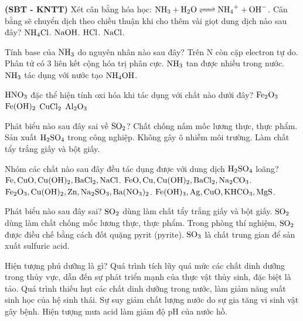 \documentclass[12pt,a4paper]{article}
\begin{document}
\begin{ex}
\textbf{(SBT - KNTT)} Xét cân bằng hóa học: $\ce{NH3 + H2O <=> NH4+ + OH-}$. Cân bằng sẽ chuyển dịch theo chiều thuận khi cho thêm vài giọt dung dịch nào sau đây?
\choice
{$\ce{NH4Cl}$.}
{$\ce{NaOH}$.}
{$\ce{HCl}$.}
{$\ce{NaCl}$.}
\loigiai{}
\end{ex}

\begin{ex}
Tính base của $\ce{NH3}$ do nguyên nhân nào sau đây?
\choice
{Trên N còn cặp electron tự do.}
{Phân tử có 3 liên kết cộng hóa trị phân cực.}
{$\ce{NH3}$ tan được nhiều trong nước.}
{$\ce{NH3}$ tác dụng với nước tạo $\ce{NH4OH}$.}
\loigiai{}
\end{ex}

\begin{ex}
$\ce{HNO3}$ đặc thể hiện tính oxi hóa khi tác dụng với chất nào dưới đây?
\choice
{$\ce{Fe2O3}$}
{$\ce{Fe(OH)2}$}
{$\ce{CuCl2}$}
{$\ce{Al2O3}$}
\loigiai{}
\end{ex}

\begin{ex}
Phát biểu nào sau đây sai về $\ce{SO2}$?
\choice
{Chất chống nấm mốc lương thực, thực phẩm.}
{Sản xuất $\ce{H2SO4}$ trong công nghiệp.}
{Không gây ô nhiễm môi trường.}
{Làm chất tẩy trắng giấy và bột giấy.}
\loigiai{}
\end{ex}

\begin{ex}
Nhóm các chất nào sau đây đều tác dụng được với dung dịch $\ce{H2SO4}$ loãng?
\choice
{$\ce{Fe, CuO, Cu(OH)2, BaCl2, NaCl}$.}
{$\ce{FeO, Cu, Cu(OH)2, BaCl2, Na2CO3}$.}
{$\ce{Fe2O3, Cu(OH)2, Zn, Na2SO3, Ba(NO3)2}$.}
{$\ce{Fe(OH)3, Ag, CuO, KHCO3, MgS}$.}
\loigiai{}
\end{ex}

\begin{ex}
Phát biểu nào sau đây sai?
\choice
{$\ce{SO2}$ dùng làm chất tẩy trắng giấy và bột giấy.}
{$\ce{SO2}$ dùng làm chất chống mốc lương thực, thực phẩm.}
{Trong phòng thí nghiệm, $\ce{SO2}$ được điều chế bằng cách đốt quặng pyrit (pyrite).}
{$\ce{SO3}$ là chất trung gian để sản xuất sulfuric acid.}
\loigiai{}
\end{ex}

\begin{ex}
Hiện tượng phú dưỡng là gì?
\choice
{Quá trình tích lũy quá mức các chất dinh dưỡng trong thủy vực, dẫn đến sự phát triển mạnh của thực vật thủy sinh, đặc biệt là tảo.}
{Quá trình thiếu hụt các chất dinh dưỡng trong nước, làm giảm năng suất sinh học của hệ sinh thái.}
{Sự suy giảm chất lượng nước do sự gia tăng vi sinh vật gây bệnh.}
{Hiện tượng mưa acid làm giảm độ pH của nước hồ.}
\loigiai{}
\end{ex}
\end{document}
